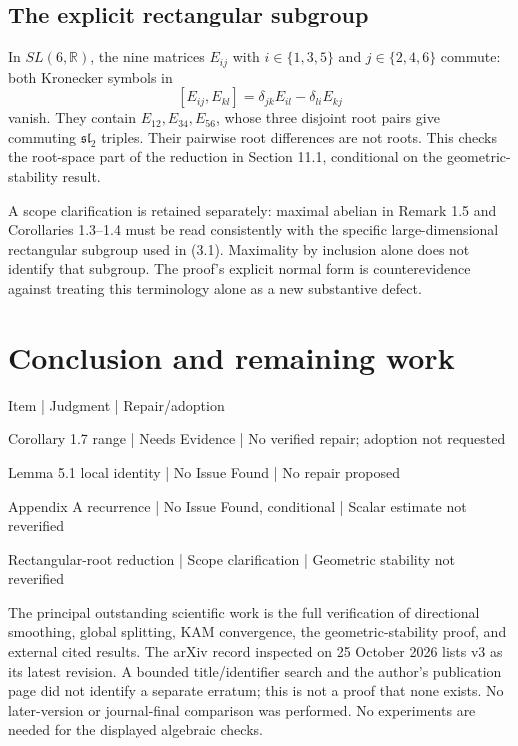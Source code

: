 \documentclass[10pt]{article}
\begin{document}
\subsection*{The explicit rectangular subgroup}
In \(SL(6,\mathbb R)\), the nine matrices \(E_{ij}\) with \(i\in\{1,3,5\}\) and \(j\in\{2,4,6\}\) commute: both Kronecker symbols in \[[E_{ij},E_{kl}]=\delta_{jk}E_{il}-\delta_{li}E_{kj}\] vanish. They contain \(E_{12},E_{34},E_{56}\), whose three disjoint root pairs give commuting \(\mathfrak{sl}_2\) triples. Their pairwise root differences are not roots. This checks the root-space part of the reduction in Section 11.1, conditional on the geometric-stability result.\par
A scope clarification is retained separately: maximal abelian in Remark 1.5 and Corollaries 1.3–1.4 must be read consistently with the specific large-dimensional rectangular subgroup used in (3.1). Maximality by inclusion alone does not identify that subgroup. The proof’s explicit normal form is counterevidence against treating this terminology alone as a new substantive defect.\par
\section*{Conclusion and remaining work}
Item | Judgment | Repair/adoption\par
Corollary 1.7 range | Needs Evidence | No verified repair; adoption not requested\par
Lemma 5.1 local identity | No Issue Found | No repair proposed\par
Appendix A recurrence | No Issue Found, conditional | Scalar estimate not reverified\par
Rectangular-root reduction | Scope clarification | Geometric stability not reverified\par
The principal outstanding scientific work is the full verification of directional smoothing, global splitting, KAM convergence, the geometric-stability proof, and external cited results. The arXiv record inspected on 25 October 2026 lists v3 as its latest revision. A bounded title/identifier search and the author’s publication page did not identify a separate erratum; this is not a proof that none exists. No later-version or journal-final comparison was performed. No experiments are needed for the displayed algebraic checks.\par
\end{document}

